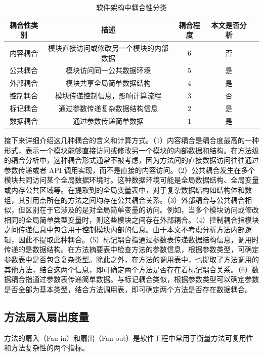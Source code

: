 \begin{table}[htbp]
\caption{软件架构中耦合性分类}
\label{4_软件架构中耦合性分类}
\vspace{0.5em}\centering\wuhao
\begin{tabular}{ccccc}
\toprule
耦合性类别 & 描述 & 耦合程度 & 本文是否分析 \\
\midrule
内容耦合 & 模块直接访问或修改另一个模块的内部数据 & 6 & 否\\
公共耦合 & 模块访问同一公共数据环境 & 5 & 是 \\
外部耦合 & 模块共享全局简单数据结构 & 4 & 是 \\
控制耦合 & 模块传递控制信息，影响计算流程 & 3 & 否 \\
标记耦合 & 通过参数传递复杂数据结构信息 & 2 & 是 \\
数据耦合 & 通过参数传递简单数据 & 1 & 是 \\
\bottomrule
\end{tabular}
\end{table}

接下来详细介绍这几种耦合的含义和计算方式。（1）内容耦合是耦合度最高的一种形式，表示一个模块能够直接访问或修改另一个模块的内部数据和结构。在方法级的耦合分析中，这种耦合形式通常不被考虑，因为方法间的直接数据访问往往通过参数传递或者 API 调用实现，而不是直接的内容访问。（2）公共耦合发生在多个模块共同访问某个全局数据环境时。这种数据环境可能是全局数据结构、全局变量或内存公共区域等。在提取到的全局变量表中，对于复杂数据结构如结构体和数组，其引用点所在的方法之间均存在公共耦合关系。（3）外部耦合与公共耦合相似，但区别在于它涉及的是对全局简单变量的访问。例如，当多个模块访问或修改相同的全局简单类型变量时，则这些模块之间存在外部耦合。（4）控制耦合指模块之间传递信息中包含用于控制模块内部的信息。由于本文不考虑分析方法内部逻辑，因此不提取此种耦合。（5）标记耦合指通过参数表传递数据结构信息，调用时传递的是数据结构。在方法摘要表中检查方法的参数信息，根据参数类型，可确定参数表中是否包含复杂类型。除此之外，在方法的调用表中，也提取了方法调用的其他方法，结合这两个信息，即可确定两个方法是否存在着标记耦合关系。（6）数据耦合指通过参数表传递简单数据。与标记耦合类似，根据参数类型可以确定参数是否全部为基本类型，结合方法调用表，即可确定两个方法是否存在数据耦合。

\subsection{方法扇入扇出度量}

方法的扇入（Fan-in）和扇出（Fan-out）是软件工程中常用于衡量方法可复用性和方法复杂性的两个指标。



